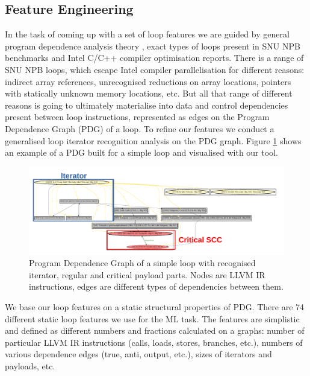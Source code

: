 \documentclass{acaces}
\begin{document}
\subsection{Feature Engineering}
\label{feature_engineering}
\quad In the task of coming up with a set of loop features we are guided by general program dependence analysis theory \cite{Kennedy:2001:OCM:502981}, exact types of loops present in SNU NPB benchmarks and Intel C/C++ compiler optimisation reports.\newline\null
\quad There is a range of SNU NPB loops, which escape Intel compiler parallelisation for different reasons: indirect array references, unrecognised reductions on array locations, pointers with statically unknown memory locations, etc. But all that range of different reasons is going to ultimately materialise into data and control dependencies present between loop instructions, represented as edges on the Program Dependence Graph (PDG) \cite{Ferrante:1987:PDG:24039.24041} of a loop. To refine our features we conduct a generalised loop iterator recognition \cite{Manilov:2018:GPI:3178372.3179511} analysis on the PDG graph. Figure \ref{fig:pdg} shows an example of a PDG built for a simple loop and visualised with our tool.\newline\null
\begin{figure}
\centering
\includegraphics[width=1.0\textwidth]{pdg_example}
\caption{Program Dependence Graph of a simple loop with recognised iterator, regular and critical payload parts. Nodes are LLVM IR instructions, edges are different types of dependencies between them.}
\label{fig:pdg}
\end{figure}
\quad We base our loop features on a static structural properties of PDG. There are 74 different static loop features we use for the ML task. The features are simplistic and defined as different numbers and fractions calculated on a graphs: number of particular LLVM IR instructions (calls, loads, stores, branches, etc.), numbers of various dependence edges (true, anti, output, etc.), sizes of iterators and payloads, etc.
\end{document}
